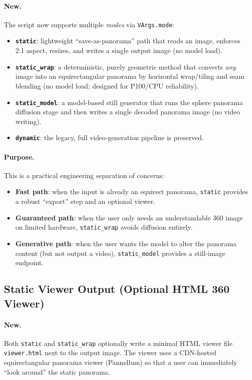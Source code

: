 \documentclass[11pt,a4paper]{article}
\newcommand{\file}[1]{\texttt{#1}}
\newcommand{\fn}[1]{\texttt{#1}}
\begin{document}
\paragraph{New.}
The script now supports multiple \emph{modes} via \fn{VArgs.mode}:
\begin{itemize}[nosep]
    \item \textbf{\texttt{static}}: lightweight ``save-as-panorama'' path that reads an image, enforces 2:1 aspect, resizes, and writes a single output image (no model load).
    \item \textbf{\texttt{static\_wrap}}: a deterministic, purely geometric method that converts \emph{any} image into an equirectangular panorama by horizontal wrap/tiling and seam blending (no model load; designed for P100/CPU reliability).
    \item \textbf{\texttt{static\_model}}: a model-based still generator that runs the sphere panorama diffusion stage and then writes a single decoded panorama image (no video writing).
    \item \textbf{\texttt{dynamic}}: the legacy, full video-generation pipeline is preserved.
\end{itemize}

\paragraph{Purpose.}
This is a practical engineering separation of concerns:
\begin{itemize}[nosep]
    \item \textbf{Fast path}: when the input is already an equirect panorama, \texttt{static} provides a robust ``export'' step and an optional viewer.
    \item \textbf{Guaranteed path}: when the user only needs an understandable 360 image on limited hardware, \texttt{static\_wrap} avoids diffusion entirely.
    \item \textbf{Generative path}: when the user wants the model to alter the panorama content (but not output a video), \texttt{static\_model} provides a still-image endpoint.
\end{itemize}

\subsection{Static Viewer Output (Optional HTML 360 Viewer)}

\paragraph{New.}
Both \texttt{static} and \texttt{static\_wrap} optionally write a minimal HTML viewer file \file{viewer.html} next to the output image.
The viewer uses a CDN-hosted equirectangular panorama viewer (Pannellum) so that a user can immediately ``look around'' the static panorama.
\end{document}
